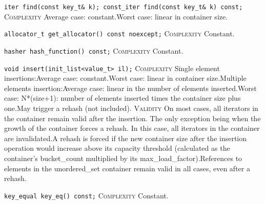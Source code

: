 \noindent{}\hspace*{0.25em}\lstinline[basicstyle=\ttfamily\color{corange}]{iter find(const key_t& k); const_iter find(const key_t& k) const;} \textsc{Complexity} Average case: constant.Worst case: linear in container size.\\\vspace{-0.6em}

\noindent{}\hspace*{0.25em}\lstinline[basicstyle=\ttfamily\color{cgreen}]{allocator_t get_allocator() const noexcept;} \textsc{Complexity} Constant.\\\vspace{-0.6em}

\noindent{}\hspace*{0.25em}\lstinline[basicstyle=\ttfamily\color{cgreen}]{hasher hash_function() const;} \textsc{Complexity} Constant.\\\vspace{-0.6em}

\noindent{}\hspace*{0.25em}\lstinline[basicstyle=\ttfamily\color{corange}]{void insert(init_list<value_t> il);} \textsc{Complexity} Single element insertions:Average case: constant.Worst case: linear in container size.Multiple elements insertion:Average case: linear in the number of elements inserted.Worst case: N*(size+1): number of elements inserted times the container size plus one.May trigger a rehash (not included). \textsc{Validity} On most cases, all iterators in the container remain valid after the insertion. The only exception being when the growth of the container forces a rehash. In this case, all iterators in the container are invalidated.A rehash is forced if the new container size after the insertion operation would increase above its capacity threshold (calculated as the container's bucket\_count multiplied by its max\_load\_factor).References to elements in the unordered\_set container remain valid in all cases, even after a rehash.\\\vspace{-0.6em}

\noindent{}\hspace*{0.25em}\lstinline[basicstyle=\ttfamily\color{cgreen}]{key_equal key_eq() const;} \textsc{Complexity} Constant.\\\vspace{-0.6em}

